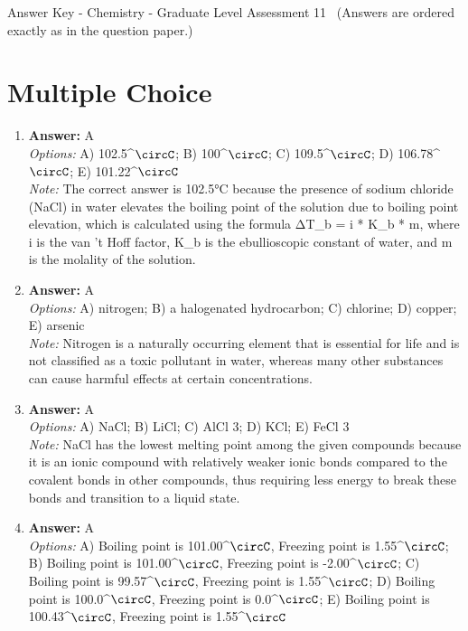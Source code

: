 \documentclass[12pt]{article}
\begin{document}
\begin{center}
Answer Key - Chemistry - Graduate Level Assessment 11 \
\small (Answers are ordered exactly as in the question paper.)
\end{center}

\section*{Multiple Choice}
\begin{enumerate}[label=\arabic*.]
\item \textbf{Answer:} A
\\ \textit{Options:} A) 102.5^\ensuremath{\circC}; B) 100^\ensuremath{\circC}; C) 109.5^\ensuremath{\circC}; D) 106.78^\ensuremath{\circC}; E) 101.22^\ensuremath{\circC}
\\ \textit{Note:} The correct answer is 102.5°C because the presence of sodium chloride (NaCl) in water elevates the boiling point of the solution due to boiling point elevation, which is calculated using the formula ΔT\_b = i * K\_b * m, where i is the van 't Hoff factor, K\_b is the ebullioscopic constant of water, and m is the molality of the solution.
\item \textbf{Answer:} A
\\ \textit{Options:} A) nitrogen; B) a halogenated hydrocarbon; C) chlorine; D) copper; E) arsenic
\\ \textit{Note:} Nitrogen is a naturally occurring element that is essential for life and is not classified as a toxic pollutant in water, whereas many other substances can cause harmful effects at certain concentrations.
\item \textbf{Answer:} A
\\ \textit{Options:} A) NaCl; B) LiCl; C) AlCl 3; D) KCl; E) FeCl 3
\\ \textit{Note:} NaCl has the lowest melting point among the given compounds because it is an ionic compound with relatively weaker ionic bonds compared to the covalent bonds in other compounds, thus requiring less energy to break these bonds and transition to a liquid state.
\item \textbf{Answer:} A
\\ \textit{Options:} A) Boiling point is 101.00^\ensuremath{\circC}, Freezing point is 1.55^\ensuremath{\circC}; B) Boiling point is 101.00^\ensuremath{\circC}, Freezing point is -2.00^\ensuremath{\circC}; C) Boiling point is 99.57^\ensuremath{\circC}, Freezing point is 1.55^\ensuremath{\circC}; D) Boiling point is 100.0^\ensuremath{\circC}, Freezing point is 0.0^\ensuremath{\circC}; E) Boiling point is 100.43^\ensuremath{\circC}, Freezing point is 1.55^\ensuremath{\circC}

\end{enumerate}
\end{document}
